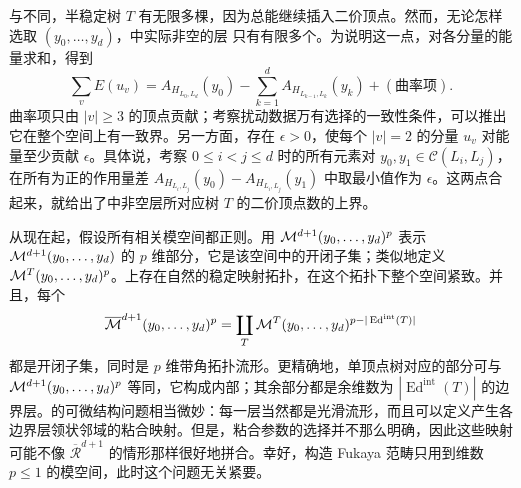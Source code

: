 与不同，半稳定树 $T$ 有无限多棵，因为总能继续插入二价顶点。然而，无论怎样选取 $(y_0,\ldots,y_d)$，中实际非空的层
只有有限多个。为说明这一点，对各分量的能量求和，得到
\[
\sum_vE(u_v)=A_{H_{L_0,L_d}}(y_0)-\sum_{k=1}^dA_{H_{L_{k-1},L_k}}(y_k)+(\text{曲率项}).
\]
曲率项只由 $|v|\geq3$ 的顶点贡献；考察扰动数据万有选择的一致性条件，可以推出它在整个空间上有一致界。另一方面，存在 $\epsilon>0$，使每个 $|v|=2$ 的分量 $u_v$ 对能量至少贡献 $\epsilon$。具体说，考察 $0\leq i<j\leq d$ 时的所有元素对 $y_0,y_1\in\mathcal C(L_i,L_j)$，在所有为正的作用量差 $A_{H_{L_i,L_j}}(y_0)-A_{H_{L_i,L_j}}(y_1)$ 中取最小值作为 $\epsilon$。这两点合起来，就给出了中非空层所对应树 $T$ 的二价顶点数的上界。

从现在起，假设所有相关模空间都正则。用 $\mathcal M^{d+1}(y_0,\ldots,y_d)^p$ 表示 $\mathcal M^{d+1}(y_0,\ldots,y_d)$ 的 $p$ 维部分，它是该空间中的开闭子集；类似地定义 $\mathcal M^T(y_0,\ldots,y_d)^p$。上存在自然的稳定映射拓扑，在这个拓扑下整个空间紧致。并且，每个
\begin{equation}\label{eq:9.29}
\overline{\mathcal M}^{d+1}(y_0,\ldots,y_d)^p
=\coprod_T\mathcal M^T(y_0,\ldots,y_d)^{p-|\operatorname{Ed}^{\mathrm{int}}(T)|}
\end{equation}
都是开闭子集，同时是 $p$ 维带角拓扑流形。更精确地，单顶点树对应的部分可与 $\mathcal M^{d+1}(y_0,\ldots,y_d)^p$ 等同，它构成内部；其余部分都是余维数为 $|\operatorname{Ed}^{\mathrm{int}}(T)|$ 的边界层。的可微结构问题相当微妙：每一层当然都是光滑流形，而且可以定义产生各边界层领状邻域的粘合映射。但是，粘合参数的选择并不那么明确，因此这些映射可能不像 $\overline{\mathcal R}^{d+1}$ 的情形那样很好地拼合。幸好，构造 Fukaya 范畴只用到维数 $p\leq1$ 的模空间，此时这个问题无关紧要。

